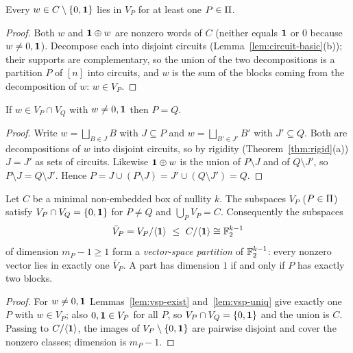 \begin{lemma}[Existence]\label{lem:vsp-exist}
Every $w\in C\setminus\{0,\mathbf 1\}$ lies in $V_P$ for at least one $P\in\Pi$.
\end{lemma}

\begin{proof}
Both $w$ and $\mathbf 1\oplus w$ are nonzero words of $C$ (neither equals $\mathbf 1$ or $0$ because $w\ne0,\mathbf 1$). Decompose each into disjoint circuits (Lemma~\ref{lem:circuit-basic}(b)); their supports are complementary, so the union of the two decompositions is a partition $P$ of $[n]$ into circuits, and $w$ is the sum of the blocks coming from the decomposition of $w$: $w\in V_P$.
\end{proof}

\begin{lemma}[Uniqueness]\label{lem:vsp-uniq}
If $w\in V_P\cap V_Q$ with $w\ne0,\mathbf 1$ then $P=Q$.
\end{lemma}

\begin{proof}
Write $w=\bigsqcup_{B\in J}B$ with $J\subseteq P$ and $w=\bigsqcup_{B'\in J'}B'$ with $J'\subseteq Q$. Both are decompositions of $w$ into disjoint circuits, so by rigidity (Theorem~\ref{thm:rigid}(a)) $J=J'$ as sets of circuits. Likewise $\mathbf 1\oplus w$ is the union of $P\setminus J$ and of $Q\setminus J'$, so $P\setminus J=Q\setminus J'$. Hence $P=J\cup(P\setminus J)=J'\cup(Q\setminus J')=Q$.
\end{proof}

\begin{theorem}\label{thm:vsp}
Let $C$ be a minimal non-embedded box of nullity $k$. The subspaces $V_P$ ($P\in\Pi$) satisfy $V_P\cap V_Q=\{0,\mathbf 1\}$ for $P\ne Q$ and $\bigcup_PV_P=C$. Consequently the subspaces
\[
\bar V_P=V_P/\langle\one\rangle\ \le\ C/\langle\one\rangle\cong\F_2^{k-1}
\]
of dimension $m_P-1\ge1$ form a \emph{vector-space partition} of $\mathbb F_2^{k-1}$: every nonzero vector lies in exactly one $\bar V_P$. A part has dimension $1$ if and only if $P$ has exactly two blocks.
\end{theorem}

\begin{proof}
For $w\ne0,\mathbf 1$ Lemmas~\ref{lem:vsp-exist} and~\ref{lem:vsp-uniq} give exactly one $P$ with $w\in V_P$; also $0,\mathbf 1\in V_P$ for all $P$, so $V_P\cap V_Q=\{0,\mathbf 1\}$ and the union is $C$. Passing to $C/\langle\mathbf 1\rangle$, the images of $V_P\setminus\{0,\mathbf 1\}$ are pairwise disjoint and cover the nonzero classes; dimension is $m_P-1$.
\end{proof}

